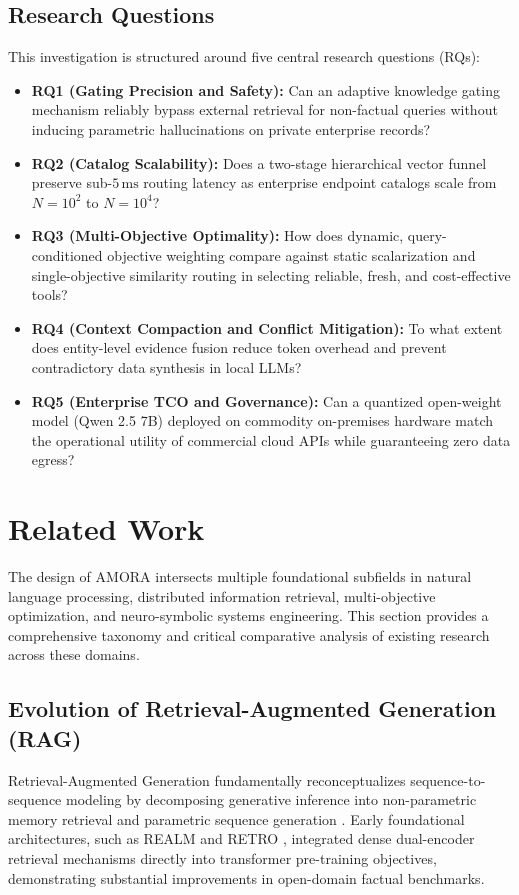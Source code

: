 \documentclass[journal,10pt,twocolumn]{IEEEtran}
\begin{document}
\subsection{Research Questions}
This investigation is structured around five central research questions (RQs):
\begin{itemize}
    \item \textbf{RQ1 (Gating Precision and Safety):} Can an adaptive knowledge gating mechanism reliably bypass external retrieval for non-factual queries without inducing parametric hallucinations on private enterprise records?
    \item \textbf{RQ2 (Catalog Scalability):} Does a two-stage hierarchical vector funnel preserve sub-$5\,\text{ms}$ routing latency as enterprise endpoint catalogs scale from $N = 10^2$ to $N = 10^4$?
    \item \textbf{RQ3 (Multi-Objective Optimality):} How does dynamic, query-conditioned objective weighting compare against static scalarization and single-objective similarity routing in selecting reliable, fresh, and cost-effective tools?
    \item \textbf{RQ4 (Context Compaction and Conflict Mitigation):} To what extent does entity-level evidence fusion reduce token overhead and prevent contradictory data synthesis in local LLMs?
    \item \textbf{RQ5 (Enterprise TCO and Governance):} Can a quantized open-weight model (Qwen 2.5 7B) deployed on commodity on-premises hardware match the operational utility of commercial cloud APIs while guaranteeing zero data egress?
\end{itemize}

\section{Related Work}
\label{sec:related_work}

The design of AMORA intersects multiple foundational subfields in natural language processing, distributed information retrieval, multi-objective optimization, and neuro-symbolic systems engineering. This section provides a comprehensive taxonomy and critical comparative analysis of existing research across these domains.

\subsection{Evolution of Retrieval-Augmented Generation (RAG)}
Retrieval-Augmented Generation fundamentally reconceptualizes sequence-to-sequence modeling by decomposing generative inference into non-parametric memory retrieval and parametric sequence generation \cite{lewis2020rag}. Early foundational architectures, such as REALM \cite{guu2020realm} and RETRO \cite{borgeaud2022retro}, integrated dense dual-encoder retrieval mechanisms directly into transformer pre-training objectives, demonstrating substantial improvements in open-domain factual benchmarks.
\end{document}
